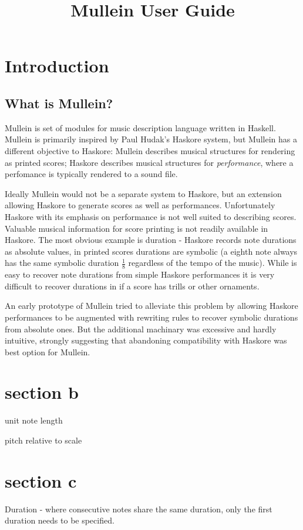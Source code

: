 \documentclass{article}
\begin{document}
\title{Mullein User Guide}
\maketitle

\section{Introduction}
\subsection{What is Mullein?}
Mullein is set of modules for music description language written 
in Haskell. Mullein is primarily inspired by Paul Hudak's 
Haskore system, but Mullein has a different objective to Haskore: 
Mullein describes musical structures for rendering as printed 
scores; Haskore describes musical structures for 
\emph{performance}, where a perfomance is typically rendered to 
a sound file. 

Ideally Mullein would not be a separate system to Haskore, but
an extension allowing Haskore to generate scores as well 
as performances. Unfortunately Haskore with its emphasis on 
performance is not well suited to describing scores. Valuable
musical information for score printing is not readily available
in Haskore. The most obvious example is duration - Haskore 
records note durations as absolute values, in printed scores 
durations are symbolic (a eighth note always has the same 
symbolic duration \(\frac{1}{8}\) regardless of the tempo 
of the music). While is easy to recover note durations from 
simple Haskore performances it is very difficult to recover 
durations in if a score has trills or other ornaments.

An early prototype of Mullein tried to alleviate this problem 
by allowing Haskore performances to be augmented with rewriting 
rules to recover symbolic durations from absolute ones. But the 
additional machinary was excessive and hardly intuitive, 
strongly suggesting that abandoning compatibility with Haskore
was best option for Mullein.

\section{section b}

unit note length

pitch relative to scale 

\section{section c}
Duration - where consecutive notes share the same duration, only
the first duration needs to be specified. 
\end{document}
